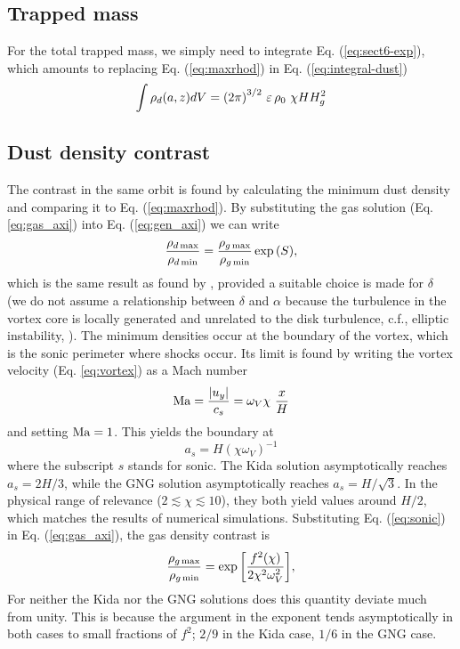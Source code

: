 \documentclass[apj]{emulateapj}
\newcommand{\Eq}[1]{Eq. (\ref{#1})}
\newcommand{\eq}[1]{\Eq{#1}}
\newcommand{\eqp}[1]{(Eq. \ref{#1})}
\newcommand{\beq}{\begin{equation}}
\newcommand{\eeq}{\end{equation}}
\begin{document}
\subsection{Trapped mass}

For the total trapped mass, we simply need
to integrate \eq{eq:sect6-exp}, which amounts to replacing
\eq{eq:maxrhod} in \eq{eq:integral-dust}
 \beq
\int\rho_d(a,z) dV  = \left(2\pi\right)^{3/2} \, \varepsilon \, \rho_0 \ \chi H H_g^2 \label{eq:dust-mass}\\ 
\eeq


\subsection{Dust density contrast}

The contrast in the same orbit is found by calculating the
  minimum dust density and comparing it to \eq{eq:maxrhod}. By substituting the gas solution \eqp{eq:gas_axi}
  into \eq{eq:gen_axi} we can write
\beq
\frac{\rho_{d\,{\rm max}}}{\rho_{d\,{\rm min}}} = \frac{\rho_{g\,{\rm max}}}{\rho_{g\,{\rm min}}} \exp{(S)},\label{eq:max-contrast}
\eeq
which is the same result
as found by \cite{Birnstiel13}, provided a suitable choice is made for
$\delta$ (we do not assume a relationship between $\delta$ and $\alpha$
because the turbulence in the vortex core is locally generated and
unrelated to the disk turbulence, c.f., elliptic instability,
\citealt{Lesur-Papaloizou10,Lyra-Klahr11}).
%
 The minimum densities occur at the boundary of the vortex, which is
 the sonic perimeter where shocks occur. Its limit is found by
 writing the vortex velocity \eqp{eq:vortex} as a Mach number 
\beq
  {\rm Ma} = \frac{|u_y|}{c_s} = \omega_V\chi \  \frac{x}{H} 
  \label{eq:vortex-mach}
\eeq and setting ${\rm Ma} = 1$. This yields the
boundary at 
\beq
a_s = H (\chi \omega_V)^{-1} \label{eq:sonic}
\eeq where the subscript $s$ stands for
sonic. The Kida solution asymptotically reaches $a_s=2H/3$, while the
GNG solution asymptotically reaches $a_s=H/\sqrt{3}$. In the physical
range of relevance ($2\lesssim \chi \lesssim 10$), they both yield values around $H/2$, which matches  
the results of numerical simulations. Substituting \eq{eq:sonic} in \eq{eq:gas_axi}, the gas density contrast is 
\beq
  \frac{\rho_{g\,{\rm max}}}{\rho_{g\,{\rm min}}} =
  \exp{\left[\frac{f^2(\chi)}{2\chi^2\omega_V^2}\right]}, \label{eq:gas-contrast}
\eeq
\noindent For neither the Kida nor the GNG solutions does this quantity
deviate much from unity. This is because the argument in the exponent tends
asymptotically in both cases to small fractions of $f^2$; $2/9$ in the
Kida case, $1/6$ in the GNG case. 
\end{document}
